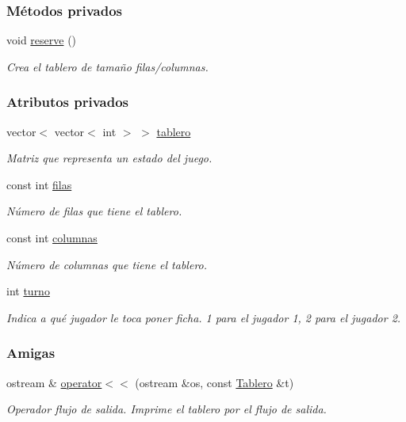 \subsubsection*{Métodos privados}
\begin{DoxyCompactItemize}
\item 
void \hyperlink{classTablero_ac2a20883f540c4d010dafab236390cb3}{reserve} ()
\begin{DoxyCompactList}\small\item\em Crea el tablero de tamaño filas/columnas. \end{DoxyCompactList}\end{DoxyCompactItemize}
\subsubsection*{Atributos privados}
\begin{DoxyCompactItemize}
\item 
vector$<$ vector$<$ int $>$ $>$ \hyperlink{classTablero_a5df607d108c0c0a14aa4f393b7f43030}{tablero}
\begin{DoxyCompactList}\small\item\em Matriz que representa un estado del juego. \end{DoxyCompactList}\item 
const int \hyperlink{classTablero_a6b1f04a8502106c33bf5469f791320e6}{filas}
\begin{DoxyCompactList}\small\item\em Número de filas que tiene el tablero. \end{DoxyCompactList}\item 
const int \hyperlink{classTablero_ac70289ec91b44d05da648770cc46801d}{columnas}
\begin{DoxyCompactList}\small\item\em Número de columnas que tiene el tablero. \end{DoxyCompactList}\item 
int \hyperlink{classTablero_ae460b4a3245da075dd381365abf158bc}{turno}
\begin{DoxyCompactList}\small\item\em Indica a qué jugador le toca poner ficha. 1 para el jugador 1, 2 para el jugador 2. \end{DoxyCompactList}\end{DoxyCompactItemize}
\subsubsection*{Amigas}
\begin{DoxyCompactItemize}
\item 
ostream \& \hyperlink{classTablero_a320d149883604290d56f857c9b5bcf1d}{operator$<$$<$} (ostream \&os, const \hyperlink{classTablero}{Tablero} \&t)
\begin{DoxyCompactList}\small\item\em Operador flujo de salida. Imprime el tablero por el flujo de salida. \end{DoxyCompactList}\end{DoxyCompactItemize}



